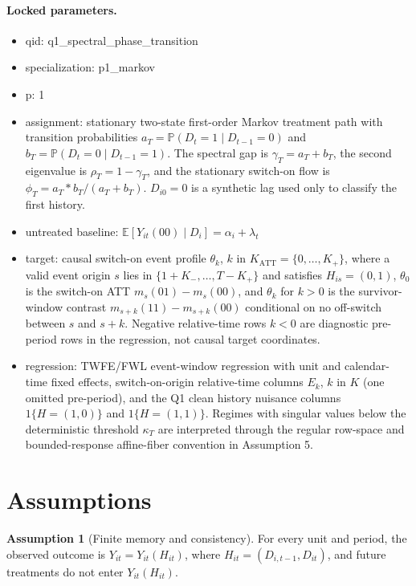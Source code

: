 \documentclass[11pt]{article}
\newcommand{\E}{\mathbb{E}}
\renewcommand{\Pr}{\mathbb{P}}
\theoremstyle{definition}
\newtheorem{assumption}{Assumption}
\theoremstyle{plain}
\theoremstyle{remark}
\begin{document}
\paragraph{Locked parameters.}
\begin{itemize}
  \item qid: q1\_spectral\_phase\_transition
  \item specialization: p1\_markov
  \item p: 1
  \item assignment: stationary two-state first-order Markov treatment path with transition probabilities \(a_T=\Pr(D_t=1\mid D_{t-1}=0)\) and \(b_T=\Pr(D_t=0\mid D_{t-1}=1)\). The spectral gap is \(\gamma_T=a_T+b_T\), the second eigenvalue is \(\rho_T=1-\gamma_T\), and the stationary switch-on flow is \(\phi_T=a_T*b_T/(a_T+b_T)\). \(D_{i0}=0\) is a synthetic lag used only to classify the first history.
  \item untreated baseline: \(\E[Y_{it}(00)\mid D_i]=\alpha_i+\lambda_t\)
  \item target: causal switch-on event profile \(\theta_k\), \(k\) in \(K_{\mathrm{ATT}}=\{0,\ldots,K_+\}\), where a valid event origin \(s\) lies in \(\{1+K_-,\ldots,T-K_+\}\) and satisfies \(H_{is}=(0,1)\), \(\theta_0\) is the switch-on ATT \(m_s(01)-m_s(00)\), and \(\theta_k\) for \(k>0\) is the survivor-window contrast \(m_{s+k}(11)-m_{s+k}(00)\) conditional on no off-switch between \(s\) and \(s+k\). Negative relative-time rows \(k<0\) are diagnostic pre-period rows in the regression, not causal target coordinates.
  \item regression: TWFE/FWL event-window regression with unit and calendar-time fixed effects, switch-on-origin relative-time columns \(E_k\), \(k\) in \(K\) (one omitted pre-period), and the Q1 clean history nuisance columns \(1\{H=(1,0)\}\) and \(1\{H=(1,1)\}\). Regimes with singular values below the deterministic threshold \(\kappa_T\) are interpreted through the regular row-space and bounded-response affine-fiber convention in Assumption 5.
\end{itemize}

\section{Assumptions}
\begin{assumption}[Finite memory and consistency]\label{ass:finite-memory}
For every unit and period, the observed outcome is \(Y_{it}=Y_{it}(H_{it})\), where \(H_{it}=(D_{i,t-1},D_{it})\), and future treatments do not enter \(Y_{it}(H_{it})\).
\end{assumption}
\end{document}
